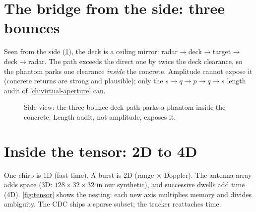 \documentclass[11pt,oneside]{book}
\begin{document}
\section{The bridge from the side: three bounces}
\label{sec:bridge-side}

Seen from the side (\cref{fig:bridge-side}), the deck is a ceiling mirror:
radar$\to$deck$\to$target$\to$deck$\to$radar. The path exceeds the direct
one by twice the deck clearance, so the phantom parks one clearance
\emph{inside} the concrete. Amplitude cannot expose it (concrete returns
are strong and plausible); only the $s\to q\to p\to q\to s$ length audit
of \cref{ch:virtual-aperture} can.

\begin{figure}[htbp]
\centering
{}
\caption{Side view: the three-bounce deck path parks a phantom inside the
concrete. Length audit, not amplitude, exposes it.}
\label{fig:bridge-side}
\end{figure}

\section{Inside the tensor: 2D to 4D}
\label{sec:tensor}

One chirp is 1D (fast time). A burst is 2D (range $\times$ Doppler). The
antenna array adds space (3D: $128\times32\times32$ in our synthetic), and
successive dwells add time (4D). \cref{fig:tensor} shows the nesting: each
new axis multiplies memory and divides ambiguity. The CDC ships a sparse
subset; the tracker reattaches time.
\end{document}
